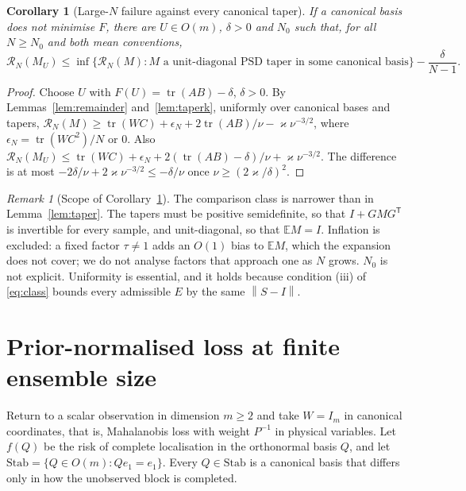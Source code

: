 \documentclass[11pt,a4paper]{article}
\numberwithin{equation}{section}
\newtheorem{corollary}[theorem]{Corollary}
\theoremstyle{remark}\newtheorem{remark}[theorem]{Remark}
\newcommand{\E}{\mathbb E}
\newcommand{\tr}{\operatorname{tr}}
\newcommand{\risk}{\mathcal R}
\newcommand{\T}{^{\mathsf T}}
\newcommand{\norm}[1]{\left\lVert#1\right\rVert}
\begin{document}
\begin{corollary}[Large-\(N\) failure against every canonical taper]\label{cor:largeN}
If a canonical basis does not minimise \(F\), there are \(U\in O(m)\), \(\delta>0\) and \(N_0\) such
that, for all \(N\ge N_0\) and both mean conventions,
\[
 \risk_N(M_U)\le\inf\bigl\{\risk_N(M):M\text{ a unit-diagonal PSD taper in some canonical basis}\bigr\}
 -\frac{\delta}{N-1}.
\]
\end{corollary}
\begin{proof}
Choose \(U\) with \(F(U)=\tr(AB)-\delta\), \(\delta>0\). By Lemmas~\ref{lem:remainder}
and~\ref{lem:taperk}, uniformly over canonical bases and tapers,
\(\risk_N(M)\ge\tr(WC)+\epsilon_N+2\tr(AB)/\nu-\varkappa\nu^{-3/2}\), where \(\epsilon_N=\tr(WC^2)/N\)
or \(0\). Also \(\risk_N(M_U)\le\tr(WC)+\epsilon_N+2(\tr(AB)-\delta)/\nu+\varkappa\nu^{-3/2}\). The
difference is at most \(-2\delta/\nu+2\varkappa\nu^{-3/2}\le-\delta/\nu\) once
\(\nu\ge(2\varkappa/\delta)^2\).
\end{proof}

\begin{remark}[Scope of Corollary~\ref{cor:largeN}]\label{rem:largeNscope}
The comparison class is narrower than in Lemma~\ref{lem:taper}. The tapers must be positive
semidefinite, so that \(I+GMG\T\) is invertible for every sample, and unit-diagonal, so that
\(\E M=I\). Inflation is excluded: a fixed factor \(\tau\ne1\) adds an \(O(1)\) bias to \(\E M\), which
the expansion does not cover; we do not analyse factors that approach one as \(N\) grows.
\(N_0\) is not explicit. Uniformity is essential, and it holds because
condition (iii) of \eqref{eq:class} bounds every admissible \(E\) by the same \(\norm{S-I}\).
\end{remark}

\section{Prior-normalised loss at finite ensemble size}\label{sec:WI}

Return to a scalar observation in dimension \(m\ge2\) and take \(W=I_m\) in canonical coordinates,
that is, Mahalanobis loss with weight \(P^{-1}\) in physical variables. Let \(f(Q)\) be the risk of
complete localisation in the orthonormal basis \(Q\), and let
\(\mathrm{Stab}=\{Q\in O(m):Qe_1=e_1\}\). Every \(Q\in\mathrm{Stab}\) is a canonical basis that
differs only in how the unobserved block is completed.
\end{document}
